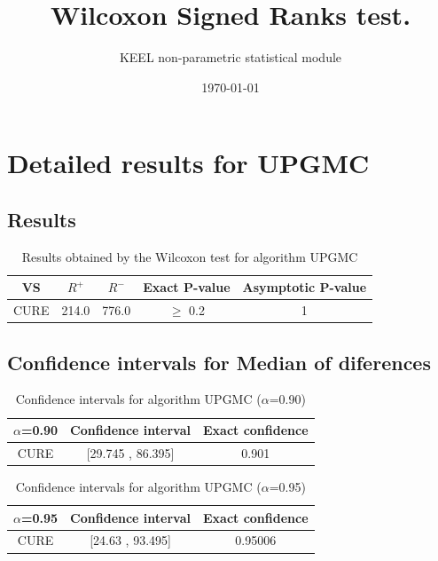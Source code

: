\documentclass[a4paper,10pt]{article}
\title{Wilcoxon Signed Ranks test.}
\date{\today}
\author{KEEL non-parametric statistical module}
\begin{document}
\pagestyle{empty}
\maketitle
\thispagestyle{empty}



\section{Detailed results for UPGMC}


\subsection{Results}

\begin{table}[!htp]
\centering\small
\begin{tabular}{
|c|c|c|c|c|}
\hline
 VS & $R^{+}$ & $R^{-}$ & Exact P-value & Asymptotic P-value \\ \hline 
CURE & 214.0 & 776.0 & $\geq$ 0.2 & 1\\ \hline 

\end{tabular}
\caption{Results obtained by the Wilcoxon test for algorithm UPGMC}
\end{table}

\subsection{Confidence intervals for Median of diferences}

\begin{table}[!htp]
\centering\small
\begin{tabular}{
|c|c|c|}
\hline
 $\alpha$=0.90 & Confidence interval & Exact confidence \\ \hline 
CURE & [29.745 , 86.395] & 0.901\\ \hline 

\end{tabular}
\caption{Confidence intervals for algorithm UPGMC ($\alpha$=0.90)}
\end{table}
\begin{table}[!htp]
\centering\small
\begin{tabular}{
|c|c|c|}
\hline
 $\alpha$=0.95 & Confidence interval & Exact confidence \\ \hline 
CURE & [24.63 , 93.495] & 0.95006\\ \hline 

\end{tabular}
\caption{Confidence intervals for algorithm UPGMC ($\alpha$=0.95)}
\end{table}
\end{document}
